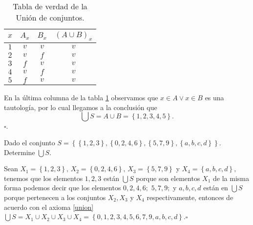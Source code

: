 \begin{table}[H]
\centering

\caption{Tabla de verdad de la Unión de conjuntos.}

\setlength\arrayrulewidth{1pt} 

\begin{tabular}{ccc|c}
\arrayrulecolor{ptctitle}\hline\cellcolor{ptctitle!50}$x$ &
\cellcolor{ptctitle!50}$A_{x}$ &
\cellcolor{ptctitle!50}$B_{x}$ &
\cellcolor{ptctitle!50}$\left(A\cup B\right)_{x}$\tabularnewline
\hline\cellcolor{ptcbackground}$1$ &
\cellcolor{ptcbackground} $v$ &
\cellcolor{ptcbackground} $v$ &
\cellcolor{ptcbackground}$v$\tabularnewline
\hline\cellcolor{gray!50}$2$ &
\cellcolor{gray!50} $v$ &
\cellcolor{gray!50} $f$ &
\cellcolor{gray!50}$v$\tabularnewline
\hline\cellcolor{ptcbackground}$3$ &
\cellcolor{ptcbackground} $f$ &
\cellcolor{ptcbackground} $v$ &
\cellcolor{ptcbackground} $v$\tabularnewline
\hline\cellcolor{gray!50}$4$ &
\cellcolor{gray!50} $v$ &
\cellcolor{gray!50} $f$ &
\cellcolor{gray!50} $v$\tabularnewline
\hline\cellcolor{ptcbackground}$5$ &
\cellcolor{ptcbackground} $f$ &
\cellcolor{ptcbackground} $v$ &
\cellcolor{ptcbackground} $v$\tabularnewline
\end{tabular}

\label{tun}
\end{table}

En la última columna de la tabla \ref{tun} observamos que $x\in A\vee x\in B$
es una tautología, por lo cual llegamos a la conclusión que 
\[
\bigcup S=A\cup B=\left\{ 1,2,3,4,5\right\} .
\]
\hfill $\square$. 

\begin{ejemplo}

Dado el conjunto $S=\left\{ \left\{ 1,2,3\right\} ,\left\{ 0,2,4,6\right\} ,\left\{ 5,7,9\right\} ,\left\{ a,b,c,d\right\} \right\} $.
Determine $\bigcup S.$

\end{ejemplo}

\solu Sean $X_{1}=\left\{ 1,2,3\right\} ,\,X_{2}=\left\{ 0,2,4,6\right\} ,\,X_{3}=\left\{ 5,7,9\right\} $
y $X_{4}=\left\{ a,b,c,d\right\} ,$ tenemos que los elementos $1,2,3$
están $\bigcup S$ porque son elementos $X_{1}$ de la misma forma
podemos decir que los elementos $0,2,4,6;$ $5,7,9;$ y $a,b,c,d$
están en $\bigcup S$ porque pertenecen a los conjuntos $X_{2},X_{3}$
y $X_{4}$ respectivamente, entonces de acuerdo con el axioma \ref{union}
$\bigcup S=X_{1}\cup X_{2}\cup X_{3}\cup X_{4}=\left\{ 0,1,2,3,4,5,6,7,9,a,b,c,d\right\} $.\hfill $\square$

